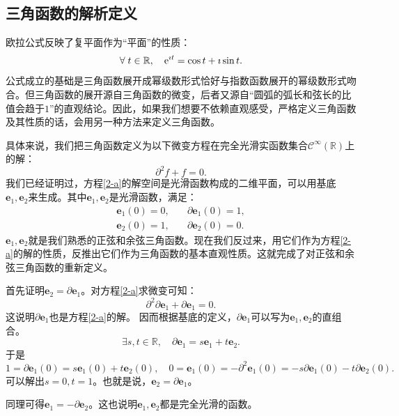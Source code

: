 \documentclass[12pt,UTF8]{ctexbook}
\begin{document}
\begin{appendix}

\section{三角函数的解析定义}

欧拉公式反映了复平面作为“平面”的性质：
$$ \forall \; t\in\mathbb{R}, \quad \mathrm{e}^{\imath t} = \cos{t} + \imath \sin{t}. $$
公式成立的基础是三角函数展开成幂级数形式恰好与指数函数展开的幂级数形式吻合。但三角函数的展开源自三角函数的微变，后者又源自“圆弧的弧长和弦长的比值会趋于$1$”的直观结论。因此，如果我们想要不依赖直观感受，严格定义三角函数及其性质的话，会用另一种方法来定义三角函数。

具体来说，我们把三角函数定义为以下微变方程在完全光滑实函数集合$\mathcal{C}^{\infty}(\mathbb{R})$上的解：
\begin{equation}
    \partial^2 f + f = 0. \label{2-a}
\end{equation}
我们已经证明过，方程\eqref{2-a}的解空间是光滑函数构成的二维平面，可以用基底$\mathbf{e}_1, \mathbf{e}_2$来生成。其中$\mathbf{e}_1, \mathbf{e}_2$是光滑函数，满足：
$$
\begin{array}{ll}
    \mathbf{e}_1(0) = 0, &\quad \partial \mathbf{e}_1(0) = 1, \\
    \mathbf{e}_2(0) = 1, &\quad \partial \mathbf{e}_2(0) = 0.
\end{array}
$$
$\mathbf{e}_1, \mathbf{e}_2$就是我们熟悉的正弦和余弦三角函数。现在我们反过来，用它们作为方程\eqref{2-a}的解的性质，反推出它们作为三角函数的基本直观性质。这就完成了对正弦和余弦三角函数的重新定义。

首先证明$\mathbf{e}_2 = \partial \mathbf{e}_1$。对方程\eqref{2-a}求微变可知：
$$ \partial^2 \partial \mathbf{e}_1 + \partial \mathbf{e}_1 = 0. $$
这说明$\partial \mathbf{e}_1$也是方程\eqref{2-a}的解。
因而根据基底的定义，$\partial \mathbf{e}_1$可以写为$\mathbf{e}_1, \mathbf{e}_2$的直组合。
$$ \exists s, t \in \mathbb{R}, \quad \partial \mathbf{e}_1 = s\mathbf{e}_1 + t\mathbf{e}_2. $$
于是
$$ 1 = \partial \mathbf{e}_1(0) = s\mathbf{e}_1(0) + t\mathbf{e}_2(0), \quad 0 = \mathbf{e}_1(0) = -\partial^2 \mathbf{e}_1(0) = -s\partial \mathbf{e}_1(0) - t\partial \mathbf{e}_2(0). $$
可以解出$s = 0, t = 1$。也就是说，$\mathbf{e}_2 = \partial \mathbf{e}_1$。

同理可得$\mathbf{e}_1 = -\partial \mathbf{e}_2$。这也说明$\mathbf{e}_1, \mathbf{e}_2$都是完全光滑的函数。


\end{appendix}
\end{document}

